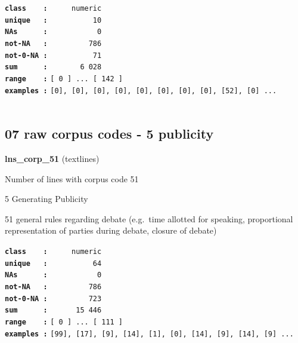 \documentclass[]{article}
\begin{document}
\textbf{\texttt{class\ \ \ \ :}} \texttt{~~~~~numeric}\\
\textbf{\texttt{unique\ \ \ :}} \texttt{~~~~~~~~~~10}\\
\textbf{\texttt{NAs\ \ \ \ \ \ :}} \texttt{~~~~~~~~~~~0}\\
\textbf{\texttt{not-NA\ \ \ :}} \texttt{~~~~~~~~~786}\\
\textbf{\texttt{not-0-NA\ :}} \texttt{~~~~~~~~~~71}\\
\textbf{\texttt{sum\ \ \ \ \ \ :}} \texttt{~~~~~~~6~028}\\
\textbf{\texttt{range\ \ \ \ :}}
\texttt{{[}\ 0\ {]}\ ...\ {[}\ 142\ {]}}\\
\textbf{\texttt{examples\ :}}
\texttt{{[}0{]},\ {[}0{]},\ {[}0{]},\ {[}0{]},\ {[}0{]},\ {[}0{]},\ {[}0{]},\ {[}0{]},\ {[}52{]},\ {[}0{]}\ ...}\\

~

\subsection{07 raw corpus codes - 5
publicity}\label{raw-corpus-codes---5-publicity}

\textbf{lns\_corp\_51} (textlines)

Number of lines with corpus code 51

5 Generating Publicity

51 general rules regarding debate (e.g.~time allotted for speaking,
proportional representation of parties during debate, closure of debate)

\textbf{\texttt{class\ \ \ \ :}} \texttt{~~~~~numeric}\\
\textbf{\texttt{unique\ \ \ :}} \texttt{~~~~~~~~~~64}\\
\textbf{\texttt{NAs\ \ \ \ \ \ :}} \texttt{~~~~~~~~~~~0}\\
\textbf{\texttt{not-NA\ \ \ :}} \texttt{~~~~~~~~~786}\\
\textbf{\texttt{not-0-NA\ :}} \texttt{~~~~~~~~~723}\\
\textbf{\texttt{sum\ \ \ \ \ \ :}} \texttt{~~~~~~15~446}\\
\textbf{\texttt{range\ \ \ \ :}}
\texttt{{[}\ 0\ {]}\ ...\ {[}\ 111\ {]}}\\
\textbf{\texttt{examples\ :}}
\texttt{{[}99{]},\ {[}17{]},\ {[}9{]},\ {[}14{]},\ {[}1{]},\ {[}0{]},\ {[}14{]},\ {[}9{]},\ {[}14{]},\ {[}9{]}\ ...}\\

~
\end{document}
